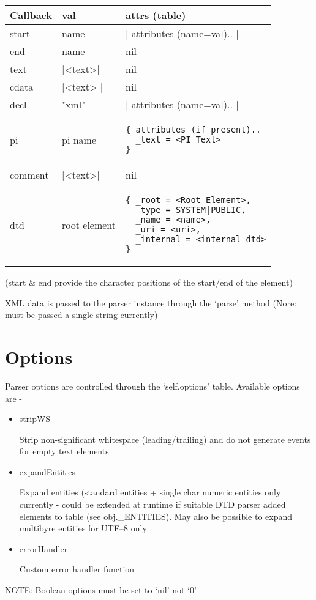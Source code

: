 \documentclass{ltxdoc}
\begin{document}
\begin{tabular}{llp{5cm}}
Callback   &  val        &    attrs (table)\\
\hline
start     &   name &   |{ attributes (name=val).. }|\\
end       &   name   &    nil\\
text      &   |<text>| &   nil\\
cdata     &   |<text> |  &   nil\\
decl      &   "xml"       &   |{ attributes (name=val).. }|\\
pi        &   pi name     &  \begin{verbatim}{ attributes (if present)..
  _text = <PI Text>
}\end{verbatim}\\
comment   &   |<text>|      &   nil\\     
dtd       &   root element  & \begin{verbatim}{ _root = <Root Element>,
  _type = SYSTEM|PUBLIC,
  _name = <name>,
  _uri = <uri>,
  _internal = <internal dtd>
}\end{verbatim}\\
\end{tabular}

(start \& end provide the character positions of the start/end of the
element)

XML data is passed to the parser instance through the `parse' method
(Nore: must be passed a single string currently)

\section{Options}

Parser options are controlled through the `self.options' table.
Available options are -

\begin{itemize}
\item
  stripWS

  Strip non-significant whitespace (leading/trailing) and do not
  generate events for empty text elements
\item
  expandEntities

  Expand entities (standard entities + single char numeric entities only
  currently - could be extended at runtime if suitable DTD parser added
  elements to table (see obj.\_ENTITIES). May also be possible to expand
  multibyre entities for UTF--8 only
\item
  errorHandler

  Custom error handler function
\end{itemize}
NOTE: Boolean options must be set to `nil' not `0'
\end{document}

